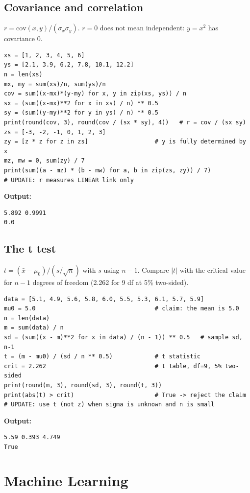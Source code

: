 \documentclass[11pt]{article}
\begin{document}
\subsection*{Covariance and correlation}
$r=\mathrm{cov}(x,y)/(\sigma_x\sigma_y)$. $r=0$ does not mean independent: $y=x^2$ has covariance $0$.
\begin{Verbatim}[fontsize=\footnotesize,frame=single]
xs = [1, 2, 3, 4, 5, 6]
ys = [2.1, 3.9, 6.2, 7.8, 10.1, 12.2]
n = len(xs)
mx, my = sum(xs)/n, sum(ys)/n
cov = sum((x-mx)*(y-my) for x, y in zip(xs, ys)) / n
sx = (sum((x-mx)**2 for x in xs) / n) ** 0.5
sy = (sum((y-my)**2 for y in ys) / n) ** 0.5
print(round(cov, 3), round(cov / (sx * sy), 4))   # r = cov / (sx sy)
zs = [-3, -2, -1, 0, 1, 2, 3]
zy = [z * z for z in zs]                   # y is fully determined by x
mz, mw = 0, sum(zy) / 7
print(sum((a - mz) * (b - mw) for a, b in zip(zs, zy)) / 7)
# UPDATE: r measures LINEAR link only
\end{Verbatim}
\textbf{Output:}
\begin{Verbatim}[fontsize=\footnotesize,frame=single]
5.892 0.9991
0.0
\end{Verbatim}
\subsection*{The t test}
$t=(\bar x-\mu_0)/(s/\sqrt n)$ with $s$ using $n-1$. Compare $|t|$ with the critical value for $n-1$ degrees of freedom (2.262 for 9 df at 5\% two-sided).
\begin{Verbatim}[fontsize=\footnotesize,frame=single]
data = [5.1, 4.9, 5.6, 5.8, 6.0, 5.5, 5.3, 6.1, 5.7, 5.9]
mu0 = 5.0                                  # claim: the mean is 5.0
n = len(data)
m = sum(data) / n
sd = (sum((x - m)**2 for x in data) / (n - 1)) ** 0.5   # sample sd, n-1
t = (m - mu0) / (sd / n ** 0.5)            # t statistic
crit = 2.262                               # t table, df=9, 5% two-sided
print(round(m, 3), round(sd, 3), round(t, 3))
print(abs(t) > crit)                       # True -> reject the claim
# UPDATE: use t (not z) when sigma is unknown and n is small
\end{Verbatim}
\textbf{Output:}
\begin{Verbatim}[fontsize=\footnotesize,frame=single]
5.59 0.393 4.749
True
\end{Verbatim}
\section{Machine Learning}
\end{document}
